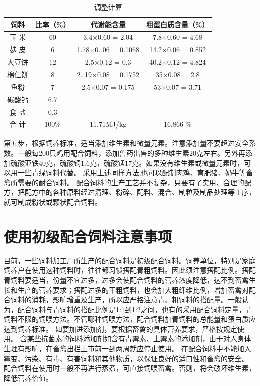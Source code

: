 \documentclass{ctexbook}
\begin{document}
\begin{table}[htbp]
	\centering
	\caption{调整计算}
	\begin{tabular}{c|c|c|c}
		\hline
饲料	&比率（\%）& 代谢能含量&	粗蛋白质含量（\%）\\ \hline 
玉 米&	60 &	3.4$\times$0.60 = 2.04 &	7.8$\times$0.60 = 4.68 \\ \hline
麸 皮&	6 &	1.78$\times$0. 06 = 0.1068 &	14.2$\times$0.06 = 0.852 \\ \hline
大豆饼&	12 &	2.5$\times$0.12 = 0.3&	40.2$\times$0.12 = 4.824 \\ \hline
棉仁饼&	8 &	2. 19$\times$0.08 = 0.1752&	35$\times$0.08 = 2.8 \\  \hline
鱼粉&	7 &	2.5$\times$0.07 = 0.175&	53$\times$0.07 = 3.71 \\ \hline
碳酸钙&	6.7 & &		 \\ \hline
食 盐&	0.3	&	& \\ \hline
合 计&	100\% &	11.71MJ/kg &	16.866 \% \\ \hline
	\end{tabular}%
	\label{tab:tiaozheng}%
\end{table}%
第五步，根据饲养标准，适当添加维生素和微量元素。注意添加量不要超过安全系数。一般每200只鸡用配合饲料，添加兽药出售的多种维生素20克左右。另外再添加硫酸亚铁40克，硫酸铜1.6克，硫酸锰17克。如果没有维生素或微量元素时，可以用一些青绿饲料代替。
采用上述同样方法,也可以配制肉鸡、育肥猪、奶牛等畜禽所需要的耐合饲料。
配合饲料的生产工艺并不复杂，只要有了实用、合理的配方，把配方中的各种原料经过清理、粉碎、配料、混合、制粒及制品处理等工序，就可制成粉状或颗状配合饲料。
\section{使用初级配合饲料注意事项}
目前，一些饲料加工厂所生产的配合饲料是初级配合饲料。饲养单位，特别是家庭饲养户在使用这种饲料时，往往都习惯搭配青粗饲料。因此须注意搭配比例。搭配青饲料要适当，份量不宜过多，过多会使配合饲料的营养浓度降低，达不到畜禽生长和生产的营养要求；搭配过多的干粗饲料，也会加大粗纤维比例，增加畜禽对配合饲料的消耗，影响增重及生产，所以应严格注意青、粗饲料的搭配量。一般认为，配合饲料与青饲料的搭配比例是1:1到1:2之间，也有的采用配合饲料定量，青饲料不限的饲喂方法。不管哪种饲喂方法，配合饲料加青饲料的总能量和蛋白质应达到饲养标准。
如要加进添加剂，要根据畜禽的具体营养要求，严格按规定使用。
含某些抗菌素的饲料添加剂如含有青霉素、土霉素的添加剂，由于对人身体生理有影响，在畜禽出栏上市前一到两周就应停止使用。
在配合饲料中不能加入霉变、污染、有毒、有害饲料和其他物质，以保证良好的适口性和畜禽的安全。
配合饲料在使用时一般不再进行蒸煮，可直接饲喂畜禽。否则，将会破坏维生素，降低营养价值。
\end{document}
